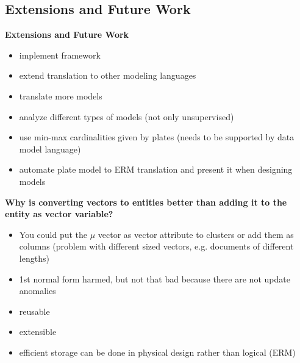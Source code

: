 \subsection{Extensions and Future Work}

\textbf{Extensions and Future Work}
\begin{itemize}
\item implement framework
\item extend translation to other modeling languages
\item translate more models
\item analyze different types of models (not only unsupervised)
\item use min-max cardinalities given by plates (needs to be supported by data model language)
\item automate plate model to ERM translation and present it when designing models
\end{itemize}

\textbf{Why is converting vectors to entities better than adding it to the entity as vector variable?}
\begin{itemize}
\item You could put the $\mu$ vector as vector attribute to clusters or add them as columns (problem with different sized vectors, e.g. documents of different lengths)
\item 1st normal form harmed, but not that bad because there are not update anomalies
\item reusable
\item extensible
\item efficient storage can be done in physical design rather than logical (ERM)
\end{itemize}

